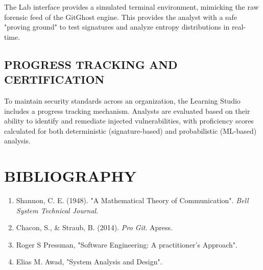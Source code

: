 \documentclass[12pt, a4paper, oneside]{report}
\begin{document}
The Lab interface provides a simulated terminal environment, mimicking the raw forensic feed of the GitGhost engine. This provides the analyst with a safe "proving ground" to test signatures and analyze entropy distributions in real-time.

\section{PROGRESS TRACKING AND CERTIFICATION}
To maintain security standards across an organization, the Learning Studio includes a progress tracking mechanism. Analysts are evaluated based on their ability to identify and remediate injected vulnerabilities, with proficiency scores calculated for both deterministic (signature-based) and probabilistic (ML-based) analysis.

\chapter*{BIBLIOGRAPHY}
\begin{enumerate}
    \item Shannon, C. E. (1948). "A Mathematical Theory of Communication". \textit{Bell System Technical Journal}.
    \item Chacon, S., \& Straub, B. (2014). \textit{Pro Git}. Apress.
    \item Roger S Pressman, "Software Engineering: A practitioner's Approach".
    \item Elias M. Awad, "System Analysis and Design".
\end{enumerate}
\end{document}
